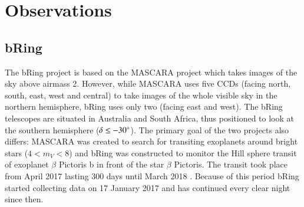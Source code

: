 \documentclass{aa}
\begin{document}



%

%
%
%
%
%
%

\section{Observations}\label{sec:obs}

\subsection{bRing}

The bRing project is based on the MASCARA project \citep{mascara} which takes images of the sky above airmass 2.
%
However, while MASCARA uses five CCDs (facing north, south, east, west and central) to take images of the whole visible sky in the northern hemisphere, bRing uses only two (facing east and west).
%
The bRing telescopes are situated in Australia and South Africa, thus positioned to look at the southern hemisphere ($\delta \leq -30 ^\circ $).
%
The primary goal of the two projects also differs: MASCARA was created to search for transiting exoplanets around bright stars ($4 < m_V < 8$) and bRing was constructed to monitor the Hill sphere transit of exoplanet $\beta$ Pictoris b in front of the star $\beta$ Pictoris.
%
The transit took place from April 2017 lasting 300 days until March 2018 \citep{Wang_2016}.
%
Because of this period bRing started collecting data on 17 January 2017 \citep{bRing} and has continued every clear night since then.
\end{document}
